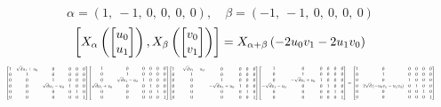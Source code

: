 \documentclass[11pt]{article}
\theoremstyle{definition}
\begin{document}
\[
\alpha = \left( 1, \  -1, \  0, \  0, \  0, \  0\right), \quad \beta = \left( -1, \  -1, \  0, \  0, \  0, \  0\right)
\]
\[
\scaletoalign{\textwidth}{\left[ X_{\alpha}\left(\left[\begin{matrix}u_{0}\\u_{1}\end{matrix}\right]\right), X_{\beta}\left(\left[\begin{matrix}v_{0}\\v_{1}\end{matrix}\right]\right) \right] = X_{\alpha + \beta}\left(- 2 u_{0} v_{1} - 2 u_{1} v_{0}\right)}
\]
\[
\scaletoalign{\textwidth}{{\left[\begin{matrix}1 & \sqrt{d} u_{1} + u_{0} & 0 & 0 & 0 & 0\\0 & 1 & 0 & 0 & 0 & 0\\0 & 0 & 1 & 0 & 0 & 0\\0 & 0 & \sqrt{d} u_{1} - u_{0} & 1 & 0 & 0\\0 & 0 & 0 & 0 & 1 & 0\\0 & 0 & 0 & 0 & 0 & 1\end{matrix}\right]} {\left[\begin{matrix}1 & 0 & 0 & 0 & 0 & 0\\0 & 1 & 0 & 0 & 0 & 0\\0 & \sqrt{d} v_{1} - v_{0} & 1 & 0 & 0 & 0\\\sqrt{d} v_{1} + v_{0} & 0 & 0 & 1 & 0 & 0\\0 & 0 & 0 & 0 & 1 & 0\\0 & 0 & 0 & 0 & 0 & 1\end{matrix}\right]} {\left[\begin{matrix}1 & - \sqrt{d} u_{1} - u_{0} & 0 & 0 & 0 & 0\\0 & 1 & 0 & 0 & 0 & 0\\0 & 0 & 1 & 0 & 0 & 0\\0 & 0 & - \sqrt{d} u_{1} + u_{0} & 1 & 0 & 0\\0 & 0 & 0 & 0 & 1 & 0\\0 & 0 & 0 & 0 & 0 & 1\end{matrix}\right]} {\left[\begin{matrix}1 & 0 & 0 & 0 & 0 & 0\\0 & 1 & 0 & 0 & 0 & 0\\0 & - \sqrt{d} v_{1} + v_{0} & 1 & 0 & 0 & 0\\- \sqrt{d} v_{1} - v_{0} & 0 & 0 & 1 & 0 & 0\\0 & 0 & 0 & 0 & 1 & 0\\0 & 0 & 0 & 0 & 0 & 1\end{matrix}\right]} = {\left[\begin{matrix}1 & 0 & 0 & 0 & 0 & 0\\0 & 1 & 0 & 0 & 0 & 0\\0 & 0 & 1 & 0 & 0 & 0\\0 & 2 \sqrt{d} \left(- u_{0} v_{1} - u_{1} v_{0}\right) & 0 & 1 & 0 & 0\\0 & 0 & 0 & 0 & 1 & 0\\0 & 0 & 0 & 0 & 0 & 1\end{matrix}\right]}}
\]
\end{document}
